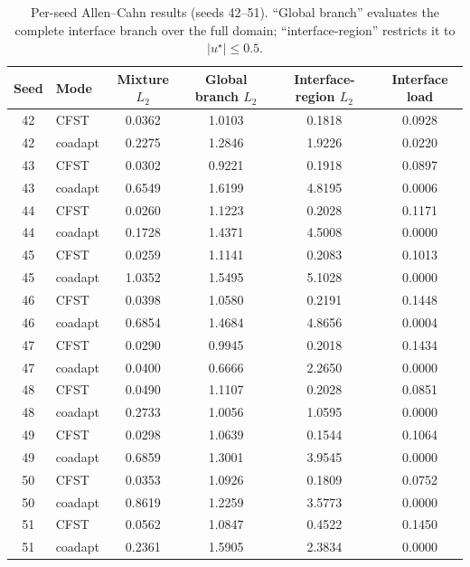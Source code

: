 \documentclass[preprint,12pt]{elsarticle}
\begin{document}
\begin{table}[H]
\centering\scriptsize
\caption{Per-seed Allen--Cahn results (seeds 42--51). ``Global branch'' evaluates the complete interface branch over the full domain; ``interface-region'' restricts it to $|u^\star|\le0.5$.}
\begin{tabular}{clcccc}
\toprule
Seed & Mode & Mixture $L_2$ & Global branch $L_2$ & Interface-region $L_2$ & Interface load\\
\midrule
42 & CFST & 0.0362 & 1.0103 & 0.1818 & 0.0928\\
42 & coadapt & 0.2275 & 1.2846 & 1.9226 & 0.0220\\
43 & CFST & 0.0302 & 0.9221 & 0.1918 & 0.0897\\
43 & coadapt & 0.6549 & 1.6199 & 4.8195 & 0.0006\\
44 & CFST & 0.0260 & 1.1223 & 0.2028 & 0.1171\\
44 & coadapt & 0.1728 & 1.4371 & 4.5008 & 0.0000\\
45 & CFST & 0.0259 & 1.1141 & 0.2083 & 0.1013\\
45 & coadapt & 1.0352 & 1.5495 & 5.1028 & 0.0000\\
46 & CFST & 0.0398 & 1.0580 & 0.2191 & 0.1448\\
46 & coadapt & 0.6854 & 1.4684 & 4.8656 & 0.0004\\
47 & CFST & 0.0290 & 0.9945 & 0.2018 & 0.1434\\
47 & coadapt & 0.0400 & 0.6666 & 2.2650 & 0.0000\\
48 & CFST & 0.0490 & 1.1107 & 0.2028 & 0.0851\\
48 & coadapt & 0.2733 & 1.0056 & 1.0595 & 0.0000\\
49 & CFST & 0.0298 & 1.0639 & 0.1544 & 0.1064\\
49 & coadapt & 0.6859 & 1.3001 & 3.9545 & 0.0000\\
50 & CFST & 0.0353 & 1.0926 & 0.1809 & 0.0752\\
50 & coadapt & 0.8619 & 1.2259 & 3.5773 & 0.0000\\
51 & CFST & 0.0562 & 1.0847 & 0.4522 & 0.1450\\
51 & coadapt & 0.2361 & 1.5905 & 2.3834 & 0.0000\\
\bottomrule
\end{tabular}
\end{table}
\end{document}
